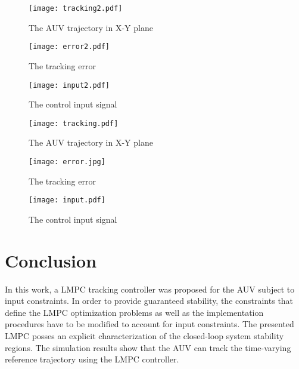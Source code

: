 \documentclass[journal,11pt,draftcls,onecolumn]{IEEEtran}
\begin{document}
\graphicspath{{./Fig/}}
\begin{figure}
\vspace{-7cm}
\texttt{[image: tracking2.pdf]}
\vspace{-7cm}
\caption{The AUV trajectory in X-Y plane}
\label{fig:fig2}%
\end{figure}

\graphicspath{{./Fig/}}
\begin{figure}
\vspace{-7cm}
\texttt{[image: error2.pdf]}
\vspace{-5cm}
\centering
\caption{The tracking error}
\label{fig:fig3}%
\end{figure}


\graphicspath{{./Fig/}}
\begin{figure}
\texttt{[image: input2.pdf]}
\centering
\caption{The control input signal}
\label{fig:fig4}%
\end{figure}

\graphicspath{{./Fig/}}
\begin{figure}
\texttt{[image: tracking.pdf]}
\centering
\caption{The AUV trajectory in X-Y plane}
\label{fig:fig5}%
\end{figure}

\graphicspath{{./Fig/}}
\begin{figure}
\texttt{[image: error.jpg]}
\centering
\caption{The tracking error}
\label{fig:fig6}%
\end{figure}


\graphicspath{{./Fig/}}
\begin{figure}
\texttt{[image: input.pdf]}
\centering
\caption{The control input signal}
\label{fig:fig7}%
\end{figure}

\section{Conclusion}
In this work, a LMPC tracking controller was proposed for the AUV subject to input constraints. In order to provide guaranteed stability, the constraints that define the LMPC optimization problems as well as the implementation procedures have to be modified to account for input constraints. The presented LMPC posses an explicit characterization of the closed-loop system stability regions. The simulation results show that the AUV can track the time-varying reference trajectory using the LMPC controller.



\end{document}
